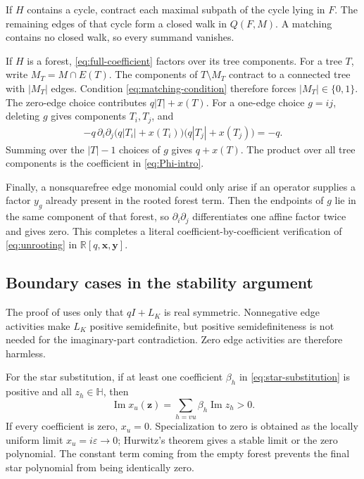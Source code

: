 \documentclass[11pt]{article}
\numberwithin{equation}{section}
\newcommand{\Hh}{\mathbb H}
\newcommand{\yy}{\bm y}
\newcommand{\xx}{\bm x}
\newcommand{\zz}{\bm z}
\begin{document}
If $H$ contains a cycle, contract each maximal subpath of the cycle lying in $F$.  The remaining edges of that cycle form a closed walk in $Q(F,M)$.  A matching contains no closed walk, so every summand vanishes.

If $H$ is a forest, \eqref{eq:full-coefficient} factors over its tree components.  For a tree $T$, write $M_T=M\cap E(T)$.  The components of $T\setminus M_T$ contract to a connected tree with $|M_T|$ edges.  Condition \eqref{eq:matching-condition} therefore forces $|M_T|\in\{0,1\}$.  The zero-edge choice contributes $q|T|+x(T)$.  For a one-edge choice $g=ij$, deleting $g$ gives components $T_i,T_j$, and
\begin{align*}
 -q\,\partial_i\partial_j
 \bigl(q|T_i|+x(T_i)\bigr)
 \bigl(q|T_j|+x(T_j)\bigr)
 =-q.
\end{align*}
Summing over the $|T|-1$ choices of $g$ gives $q+x(T)$.  The product over all tree components is the coefficient in \eqref{eq:Phi-intro}.

Finally, a nonsquarefree edge monomial could only arise if an operator supplies a factor $y_g$ already present in the rooted forest term.  Then the endpoints of $g$ lie in the same component of that forest, so $\partial_i\partial_j$ differentiates one affine factor twice and gives zero.  This completes a literal coefficient-by-coefficient verification of \eqref{eq:unrooting} in $\mathbb R[q,\xx,\yy]$.

\subsection{Boundary cases in the stability argument}\label{app:stability-boundary}

The proof of  uses only that $qI+L_K$ is real symmetric.  Nonnegative edge activities make $L_K$ positive semidefinite, but positive semidefiniteness is not needed for the imaginary-part contradiction.  Zero edge activities are therefore harmless.

For the star substitution, if at least one coefficient $\beta_h$ in \eqref{eq:star-substitution} is positive and all $z_h\in\Hh$, then
\[
 \operatorname{Im}x_u(\zz)
 =\sum_{h=vu}\beta_h\operatorname{Im}z_h>0.
\]
If every coefficient is zero, $x_u=0$.  Specialization to zero is obtained as the locally uniform limit $x_u=i\varepsilon\to0$; Hurwitz's theorem gives a stable limit or the zero polynomial.  The constant term coming from the empty forest prevents the final star polynomial from being identically zero.
\end{document}
